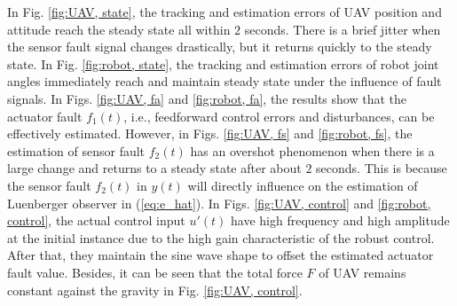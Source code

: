 \documentclass[journal,12pt,onecolumn,draftclsnofoot,]{IEEEtran}
\begin{document}
In Fig. \ref{fig:UAV, state}, the tracking and estimation errors of UAV position and attitude reach the steady state all within $2$ seconds. There is a brief jitter when the sensor fault signal changes drastically, but it returns quickly to the steady state. In Fig. \ref{fig:robot, state}, the tracking and estimation errors of robot joint angles immediately reach and maintain steady state under the influence of fault signals. In Figs. \ref{fig:UAV, fa} and \ref{fig:robot, fa}, the results show that the actuator fault $f_1(t)$, i.e., feedforward control errors and disturbances, can be effectively estimated. However, in Figs. \ref{fig:UAV, fs} and \ref{fig:robot, fs}, the estimation of sensor fault $f_2(t)$ has an overshot phenomenon when there is a large change and returns to a steady state after about $2$ seconds. This is because the sensor fault $f_2(t)$ in $y(t)$ will directly influence on the estimation of Luenberger observer in (\ref{eq:e_hat}). In Figs. \ref{fig:UAV, control} and \ref{fig:robot, control}, the actual control input $u'(t)$ have high frequency and high amplitude at the initial instance due to the high gain characteristic of the robust control. After that, they maintain the sine wave shape to offset the estimated actuator fault value. Besides, it can be seen that the total force $F$ of UAV remains constant against the gravity in Fig. \ref{fig:UAV, control}.
\end{document}
